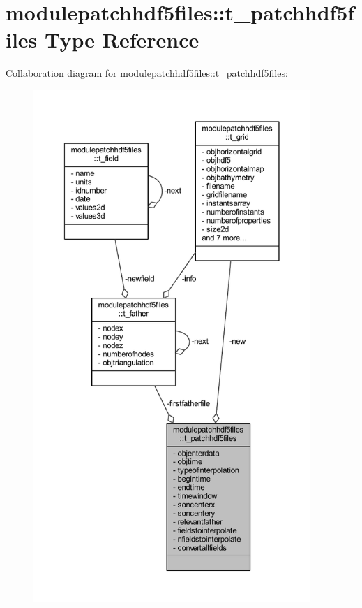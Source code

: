 \hypertarget{structmodulepatchhdf5files_1_1t__patchhdf5files}{}\section{modulepatchhdf5files\+:\+:t\+\_\+patchhdf5files Type Reference}
\label{structmodulepatchhdf5files_1_1t__patchhdf5files}


Collaboration diagram for modulepatchhdf5files\+:\+:t\+\_\+patchhdf5files\+:\nopagebreak
\begin{figure}[H]
\begin{center}
\leavevmode
\includegraphics[height=550pt]{structmodulepatchhdf5files_1_1t__patchhdf5files__coll__graph}
\end{center}
\end{figure}
